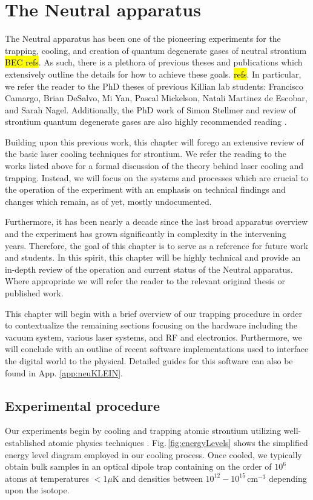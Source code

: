 \chapter{The Neutral apparatus}
\label{ch:chap2}

The Neutral apparatus has been one of the pioneering experiments for the trapping, cooling, and creation of quantum degenerate gases of neutral strontium \hl{BEC refs}. 
As such, there is a plethora of previous theses and publications which extensively outline the details for how to achieve these goals. \hl{refs}. 
In particular, we refer the reader to the PhD theses of previous Killian lab students: Francisco Camargo, Brian DeSalvo, Mi Yan, Pascal Mickelson, Natali Martinez de Escobar, and Sarah Nagel. 
Additionally, the PhD work of Simon Stellmer \cite{SimonStellmer2013} and review of strontium quantum degenerate gases are also highly recommended reading \cite{StellmerRev2013}.

Building upon this previous work, this chapter will forego an extensive review of the basic laser cooling techniques for strontium. 
We refer the reading to the works listed above for a formal discussion of the theory behind laser cooling and trapping.
Instead, we will focus on the systems and processes which are crucial to the operation of the experiment with an emphasis on technical findings and changes which remain, as of yet, mostly undocumented.

Furthermore, it has been nearly a decade since the last broad apparatus overview \cite{MartinezdeEscolar2010} and the experiment has grown significantly in complexity in the intervening years.
Therefore, the goal of this chapter is to serve as a reference for future work and students. 
In this spirit, this chapter will be highly technical and provide an in-depth review of the operation and current status of the Neutral apparatus.
Where appropriate we will refer the reader to the relevant original thesis or published work.

This chapter will begin with a brief overview of our trapping procedure in order to contextualize the remaining sections focusing on the hardware including the vacuum system, various laser systems, and RF and electronics.
Furthermore, we will conclude with an outline of recent software implementations used to interface the digital world to the physical.
Detailed guides for this software can also be found in App. \ref{app:neuKLEIN}.

\section{Experimental procedure} \label{sec:trapping}
\setcounter{footnote}{0}
Our experiments begin by cooling and trapping atomic strontium utilizing well-established atomic physics techniques \cite{Metcalf1999,Katori1999,Ido2000,Nagel2003,Mukaiyama2003a,Loftus2004,mmy09a,sth09a,Mickelson2010ja,Tey2010a,dym10a,stg10}. 
Fig.\,\ref{fig:energyLevels} shows the simplified energy level diagram employed in our cooling process. 
Once cooled, we typically obtain bulk samples in an optical dipole trap containing on the order of $10^6$ atoms at temperatures $<1\mu$K and densities between $10^{12} - 10^{15}\,$cm$^{-3}$ depending upon the isotope. 

